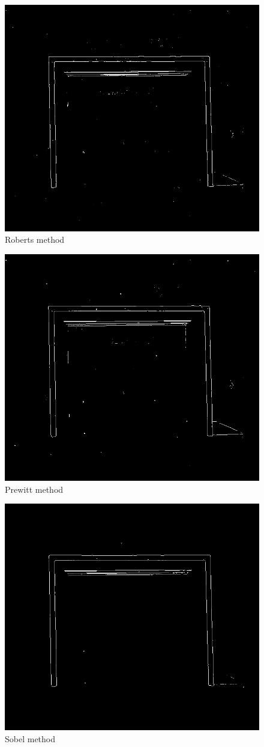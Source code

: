 \begin{figure}[H]
  \centering
  \includegraphics[width=.7\linewidth]{fig/Roberts}
  \caption{Roberts method}
  \label{fig:robertstest}
\end{figure}
\begin{figure}[H]
  \centering
  \includegraphics[width=.7\linewidth]{fig/Prewitt}
  \caption{Prewitt method}
  \label{fig:prewitttest}
\end{figure}
\begin{figure}[H]
  \centering
  \includegraphics[width=.7\linewidth]{fig/Sobel}
  \caption{Sobel method}
  \label{fig:sobeltest}
\end{figure}
